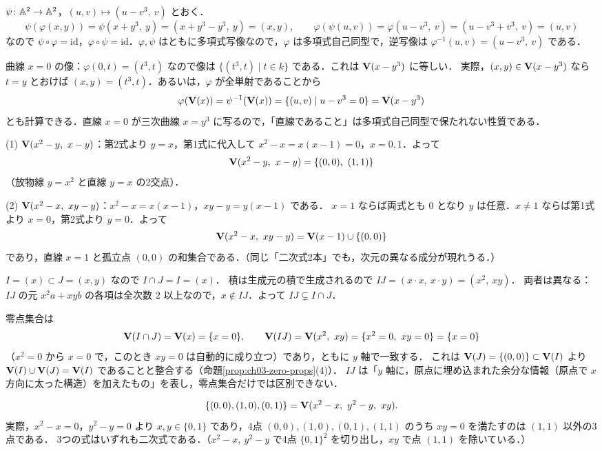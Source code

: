 $\psi\colon\mathbb{A}^2\to\mathbb{A}^2$，$(u,v)\mapsto(u-v^3,\ v)$ とおく．
\[
  \psi(\varphi(x,y))=\psi(x+y^3,\ y)=(x+y^3-y^3,\ y)=(x,y),\qquad
  \varphi(\psi(u,v))=\varphi(u-v^3,\ v)=(u-v^3+v^3,\ v)=(u,v)
\]
なので $\psi\circ\varphi=\mathrm{id}$，$\varphi\circ\psi=\mathrm{id}$．$\varphi,\psi$ はともに多項式写像なので，$\varphi$ は多項式自己同型で，逆写像は
$\varphi^{-1}(u,v)=(u-v^3,\ v)$ である．

曲線 $x=0$ の像：$\varphi(0,t)=(t^3,t)$ なので像は $\{(t^3,t)\mid t\in k\}$ である．これは $\mathbf{V}(x-y^3)$ に等しい．
実際，$(x,y)\in\mathbf{V}(x-y^3)$ なら $t=y$ とおけば $(x,y)=(t^3,t)$．あるいは，$\varphi$ が全単射であることから
\[
  \varphi(\mathbf{V}(x))=\psi^{-1}(\mathbf{V}(x))=\{(u,v)\mid u-v^3=0\}=\mathbf{V}(x-y^3)
\]
とも計算できる．直線 $x=0$ が三次曲線 $x=y^3$ に写るので，「直線であること」は多項式自己同型で保たれない性質である．

(1) $\mathbf{V}(x^2-y,\ x-y)$：第2式より $y=x$，第1式に代入して $x^2-x=x(x-1)=0$，$x=0,1$．よって
\[
  \Zero(x^2-y,\ x-y)=\{(0,0),\ (1,1)\}
\]
（放物線 $y=x^2$ と直線 $y=x$ の2交点）．

(2) $\Zero(x^2-x,\ xy-y)$：$x^2-x=x(x-1)$，$xy-y=y(x-1)$ である．
$x=1$ ならば両式とも $0$ となり $y$ は任意．$x\ne1$ ならば第1式より $x=0$，第2式より $y=0$．よって
\[
  \Zero(x^2-x,\ xy-y)=\Zero(x-1)\cup\{(0,0)\}
\]
であり，直線 $x=1$ と孤立点 $(0,0)$ の和集合である．（同じ「二次式2本」でも，次元の異なる成分が現れうる．）

$I=(x)\subset J=(x,y)$ なので $I\cap J=I=(x)$．
積は生成元の積で生成されるので $IJ=(x\cdot x,\ x\cdot y)=(x^2,\ xy)$．
両者は異なる：$IJ$ の元 $x^2a+xyb$ の各項は全次数 $2$ 以上なので，$x\notin IJ$．よって $IJ\subsetneq I\cap J$．

零点集合は
\[
  \Zero(I\cap J)=\Zero(x)=\{x=0\},\qquad \Zero(IJ)=\Zero(x^2,\ xy)=\{x^2=0,\ xy=0\}=\{x=0\}
\]
（$x^2=0$ から $x=0$ で，このとき $xy=0$ は自動的に成り立つ）であり，ともに $y$ 軸で一致する．
これは $\mathbf{V}(J)=\{(0,0)\}\subset\mathbf{V}(I)$ より $\mathbf{V}(I)\cup\mathbf{V}(J)=\mathbf{V}(I)$ であることと整合する（命題\ref{prop:ch03-zero-props}(4)）．
$IJ$ は「$y$ 軸に，原点に埋め込まれた余分な情報（原点で $x$ 方向に太った構造）を加えたもの」を表し，零点集合だけでは区別できない．

\[
  \{(0,0),(1,0),(0,1)\}=\Zero(x^2-x,\ y^2-y,\ xy).
\]
実際，$x^2-x=0$，$y^2-y=0$ より $x,y\in\{0,1\}$ であり，4点 $(0,0),(1,0),(0,1),(1,1)$ のうち $xy=0$ を満たすのは $(1,1)$ 以外の3点である．
3つの式はいずれも二次式である．（$x^2-x,\ y^2-y$ で4点 $\{0,1\}^2$ を切り出し，$xy$ で点 $(1,1)$ を除いている．）

